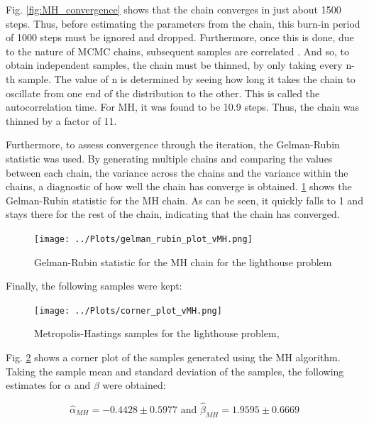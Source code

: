 \documentclass[12pt]{report} %
\begin{document}
Fig. \ref{fig:MH_convergence} shows that the chain converges in just about 1500 steps. Thus, before estimating the parameters from the chain, this burn-in period of 1000 steps must be ignored and dropped. Furthermore, once this is done, due to the nature of MCMC chains, subsequent samples are correlated \cite{vandeschoot_bayesian_statistics}\cite{wiki_metropolis_hastings}. And so, to obtain independent samples, the chain must be thinned, by only taking every n-th sample. The value of n is determined by seeing how long it takes the chain to oscillate from one end of the distribution to the other. This is called the autocorrelation time\cite{wiki_autocorrelation}. For MH, it was found to be 10.9 steps. Thus, the chain was thinned by a factor of 11.

Furthermore, to assess convergence through the iteration, the Gelman-Rubin statistic was used. By generating multiple chains and comparing the values between each chain, the variance across the chains and the variance within the chains, a diagnostic of how well the chain has converge is obtained\cite{gelman_rubin_statistic}. \ref*{fig:MH_GR} shows the Gelman-Rubin statistic for the MH chain. As can be seen, it quickly falls to 1 and stays there for the rest of the chain, indicating that the chain has converged\cite{gelman_rubin_statistic}.

\begin{figure}[h]
\centering
\texttt{[image: ../Plots/gelman\_rubin\_plot\_vMH.png]}
\caption{Gelman-Rubin statistic for the MH chain for the lighthouse problem}
\label{fig:MH_GR}
\end{figure}

\vspace*{1\baselineskip}
Finally, the following samples were kept:
\newpage

\begin{figure}[h]
\centering
\texttt{[image: ../Plots/corner\_plot\_vMH.png]}
\caption{Metropolis-Hastings samples for the lighthouse problem, }
\label{fig:MH_samples}
\end{figure}

Fig. \ref{fig:MH_samples} shows a corner plot of the samples generated using the MH algorithm. Taking the sample mean and standard deviation of the samples, the following estimates for $\alpha$ and $\beta$ were obtained:

\begin{equation}
    \hat{\alpha}_{MH} = -0.4428 \pm 0.5977 \text{ and } \hat{\beta}_{MH} = 1.9595 \pm 0.6669
\end{equation}
\end{document}
